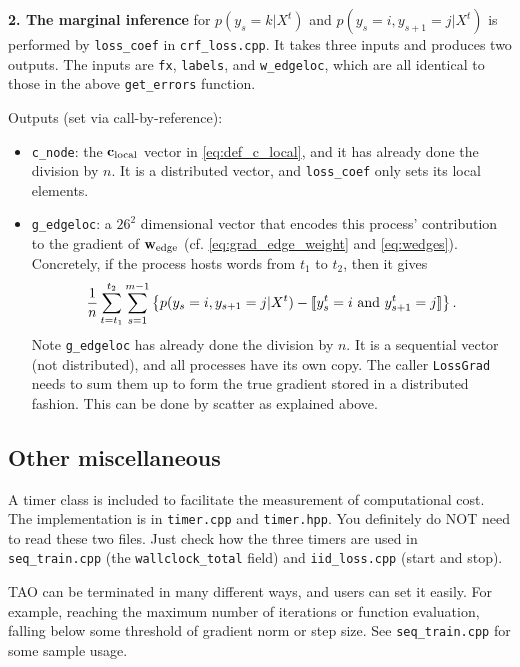 \documentclass[11pt]{report}
\begin{document}
{\bf 2. The marginal inference} for $p(y_s = k | X^t)$ and $p(y_s = i, y_{s+1}=j | X^t)$ is performed by \verb!loss_coef! in \verb!crf_loss.cpp!.
It takes three inputs and produces two outputs.
The inputs are \verb!fx!, \verb!labels!, and \verb!w_edgeloc!,
which are all identical to those in the above \verb!get_errors! function.

Outputs (set via call-by-reference):

\vspace{-1em}
\begin{itemize}
  \item \verb!c_node!: the $\mathbf{\boldsymbol{c}}_{\text{local}}$ vector in \eqref{eq:def_c_local}, and it has already done the division by $n$.  It is a distributed vector, and \verb!loss_coef! only sets its local elements.
  \item \verb!g_edgeloc!: a $26^2$ dimensional vector that encodes this process' contribution to the gradient of ${\mathbf{\boldsymbol{w}}_{\text{edge}}}$ (cf. \eqref{eq:grad_edge_weight} and \eqref{eq:wedges}).
      Concretely, if the process hosts words from $t_1$ to $t_2$, then it gives
      \begin{align}
        \frac{1}{n} \sum_{t=t_1}^{t_2} \sum_{s=1}^{m-1} \left\{p(y_s=i, y_{s+1} = j | X^t) - [\![y^t_s = i \text{ and } y^t_{s+1} = j]\!] \right\}.
      \end{align}
      Note \verb!g_edgeloc! has already done the division by $n$.
      It is a sequential vector (not distributed), and all processes have its own copy.
      The caller \verb!LossGrad! needs to sum them up to form the true gradient stored in a distributed fashion.  This can be done by scatter as explained above.
\end{itemize}
\vspace{-1em}

\subsection{Other miscellaneous}

A timer class is included to facilitate the measurement of computational cost.
The implementation is in \verb!timer.cpp! and \verb!timer.hpp!.
You definitely do NOT need to read these two files.
Just check how the three timers are used in \verb!seq_train.cpp!
(the \verb!wallclock_total! field) and \verb!iid_loss.cpp! (start and stop).

TAO can be terminated in many different ways, and users can set it easily.
For example, reaching the maximum number of iterations or function evaluation,
falling below some threshold of gradient norm or step size.
See \verb!seq_train.cpp! for some sample usage.
\end{document}
